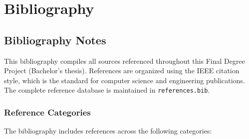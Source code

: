
\chapter{Bibliography}








\newpage

\section{Bibliography Notes}

This bibliography compiles all sources referenced throughout this Final Degree Project (Bachelor's thesis).
References are organized using the IEEE citation style, which is the standard for computer science
and engineering publications. The complete reference database is maintained in \texttt{references.bib}.

\subsection{Reference Categories}

The bibliography includes references across the following categories:

